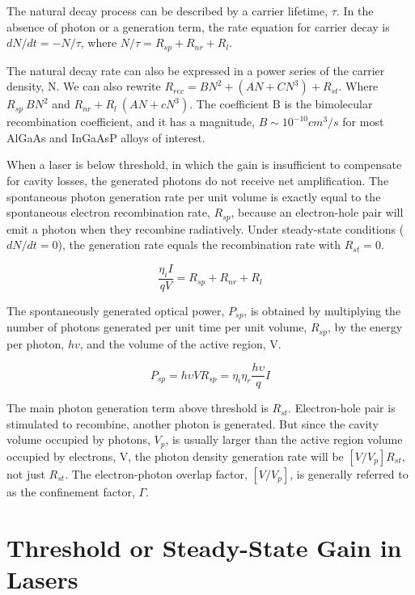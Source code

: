 The natural decay process can be described by a carrier lifetime, $\tau$. In
the absence of photon or a generation term, the rate equation for carrier decay
is $dN/dt = -N/\tau$, where $N/\tau = R_{sp} + R_{nr} + R_{l}$.

The natural decay rate can also be expressed in a power series of the carrier
density, N. We can also rewrite $R_{rec} = BN^2 + (AN + CN^3) + R_{st}$.  Where
$R_{sp} ~ BN^2$ and $R_{nr} + R_{l} ~ (AN + cN^3)$. The coefficient B is the
bimolecular recombination coefficient, and it has a magnitude, $B \sim 10^{-10}
cm^3/s$ for most AlGaAs and InGaAsP alloys of interest.

When a laser is below threshold, in which the gain is insufficient to
compensate for cavity losses, the generated photons do not receive net
amplification. The spontaneous photon generation rate per unit volume is
exactly equal to the spontaneous electron recombination rate, $R_{sp}$, because
an electron-hole pair will emit a photon when they recombine radiatively.
Under steady-state conditions ($dN/dt = 0$), the generation rate equals the
recombination rate with $R_{st} = 0$.

\begin{equation}
  \frac{\eta_{i}I}{qV} = R_{sp} + R_{nr} + R_{l}
\end{equation}

The spontaneously generated optical power, $P_{sp}$, is obtained by multiplying
the number of photons generated per unit time per unit volume, $R_{sp}$, by the
energy per photon, $hv$, and the volume of the active region, V.

\begin{equation}
  P_{sp} = h{\upsilon}VR_{sp} = \eta_i\eta_r\frac{h\upsilon}{q}I
\end{equation}

The main photon generation term above threshold is $R_{st}$. Electron-hole pair
is stimulated to recombine, another photon is generated. But since the cavity
volume occupied by photons, $V_p$, is usually larger than the active region
volume occupied by electrons, V, the photon density generation rate will be
$[V/V_p]R_{st}$, not just $R_{st}$. The electron-photon overlap factor,
$[V/V_p]$, is generally referred to as the confinement factor, $\Gamma$.

\section{Threshold or Steady-State Gain in Lasers} \label{sec:conditionals}

